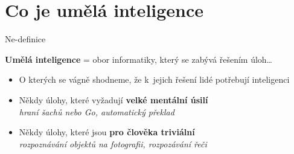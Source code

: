 \documentclass[aspectratio=169,dvipsnames]{beamer}
\begin{document}
%


\section[Co je AI]{Co je umělá inteligence}


\begin{frame}{Ne-definice}

    \begin{center}
        \Large
    \textbf{Umělá inteligence} = obor informatiky, který se zabývá řešením
    úloh\ldots
    \end{center}

    \vspace{10pt}

    \begin{itemize}

        \item<2-> O kterých se vágně shodneme, že k~jejich řešení lidé potřebují
            inteligenci

        \item<3-> Někdy úlohy, které vyžadují \textbf{velké mentální úsilí} \\
            \quad \emph{hraní šachů nebo Go, automatický překlad}

        \item<4-> Někdy úlohy, které jsou \textbf{pro člověka triviální} \\
            \quad \emph{rozpoznávání objektů na fotografii, rozpozávání řeči}

    \end{itemize}

    \centering\vspace{15pt}


\end{frame}

\end{document}
